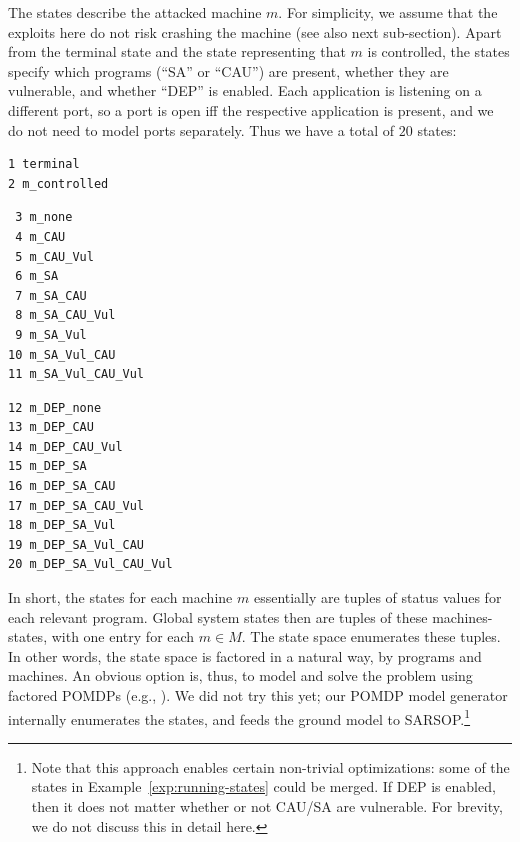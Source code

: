 \vspace{-0.05cm}
\begin{example}\label{exp:running-states}
The states describe the attacked machine $m$. For simplicity, we
assume that the exploits here do not risk crashing the machine (see
also next sub-section). Apart from the terminal state and the state
representing that $m$ is controlled, the states specify which programs
(``SA'' or ``CAU'') are present, whether they are vulnerable, and
whether ``DEP'' is enabled. Each application is listening on a
different port, so a port is open iff the respective application is
present, and we do not need to model ports separately. Thus we have a
total of $20$ states:\\ {\scriptsize
\begin{minipage}[t]{.24\linewidth}
\begin{verbatim} 
1 terminal
2 m_controlled
\end{verbatim}
\end{minipage}
\begin{minipage}[t]{.34\linewidth}
\begin{verbatim}
 3 m_none
 4 m_CAU
 5 m_CAU_Vul
 6 m_SA
 7 m_SA_CAU
 8 m_SA_CAU_Vul
 9 m_SA_Vul
10 m_SA_Vul_CAU
11 m_SA_Vul_CAU_Vul
\end{verbatim}
\end{minipage}
\begin{minipage}[t]{.30\linewidth}
\begin{verbatim}
12 m_DEP_none
13 m_DEP_CAU
14 m_DEP_CAU_Vul
15 m_DEP_SA
16 m_DEP_SA_CAU
17 m_DEP_SA_CAU_Vul
18 m_DEP_SA_Vul
19 m_DEP_SA_Vul_CAU
20 m_DEP_SA_Vul_CAU_Vul
\end{verbatim}
\end{minipage}
}
\end{example}



In short, the states for each machine $m$ essentially are tuples of
status values for each relevant program. Global system states then are
tuples of these machines-states, with one entry for each $m \in
M$. The state space enumerates these tuples. In other words, the state
space is factored in a natural way, by programs and machines. An
obvious option is, thus, to model and solve the problem using factored
POMDPs (e.g., \cite{HanFen00}). We did not try this yet; our POMDP
model generator internally enumerates the states, and feeds the ground
model to SARSOP.\footnote{Note that this approach enables certain
  non-trivial optimizations: some of the states in
  Example~\ref{exp:running-states} could be merged. If DEP is enabled,
  then it does not matter whether or not CAU/SA are vulnerable. For
  brevity, we do not discuss this in detail here.}


